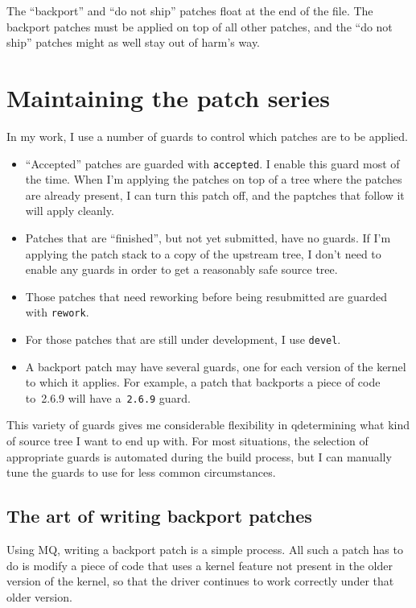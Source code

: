 The ``backport'' and ``do not ship'' patches float at the end of the
 file.  The backport patches must be applied on top
of all other patches, and the ``do not ship'' patches might as well
stay out of harm's way.

\section{Maintaining the patch series}

In my work, I use a number of guards to control which patches are to
be applied.

\begin{itemize}
\item ``Accepted'' patches are guarded with \texttt{accepted}.  I
  enable this guard most of the time.  When I'm applying the patches
  on top of a tree where the patches are already present, I can turn
  this patch off, and the paptches that follow it will apply cleanly.
\item Patches that are ``finished'', but not yet submitted, have no
  guards.  If I'm applying the patch stack to a copy of the upstream
  tree, I don't need to enable any guards in order to get a reasonably
  safe source tree.
\item Those patches that need reworking before being resubmitted are
  guarded with \texttt{rework}.
\item For those patches that are still under development, I use
  \texttt{devel}.
\item A backport patch may have several guards, one for each version
  of the kernel to which it applies.  For example, a patch that
  backports a piece of code to~2.6.9 will have a~\texttt{2.6.9} guard.
\end{itemize}
This variety of guards gives me considerable flexibility in
qdetermining what kind of source tree I want to end up with.  For most
situations, the selection of appropriate guards is automated during
the build process, but I can manually tune the guards to use for less
common circumstances.

\subsection{The art of writing backport patches}

Using MQ, writing a backport patch is a simple process.  All such a
patch has to do is modify a piece of code that uses a kernel feature
not present in the older version of the kernel, so that the driver
continues to work correctly under that older version.

